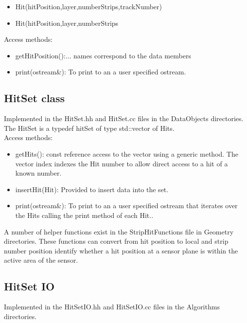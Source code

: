 \documentclass[aps,prd,superscriptaddress,floatfix]{revtex4}
\begin{document}
\begin{itemize}
\item Hit(hitPosition,layer,numberStrips,trackNumber)
\item Hit(hitPosition,layer,numberStrips
\end{itemize}

Access methods:
\begin{itemize}
\item getHitPosition():... names correspond to the data members
\item print(ostream\&): To print to an a user specified ostream.
\end{itemize}


\subsection{HitSet class}
Implemented in the HitSet.hh and HitSet.cc files in the DataObjects directories.
\\

The HitSet is a typedef hitSet of type std::vector of Hits.
\\

Access methods:

\begin{itemize}
\item getHits(): const reference access to the vector using a generic method.
The vector index indexes the Hit number to allow direct access to a hit of a known number.

\item insertHit(Hit): Provided to insert data into the set.

\item print(ostream\&): To print to an a user specified ostream that iterates over
the Hits calling the print method of each Hit..
\end{itemize}


A number of helper functions exist in the StripHitFunctions file in Geometry directories.  These functions
can convert from hit position to local and strip number position  identify whether a hit position at a sensor
plane is within the active area of the sensor.

\subsection{HitSet IO}
Implemented in the HitSetIO.hh and HitSetIO.cc files in the Algorithms directories.
\\
\end{document}

